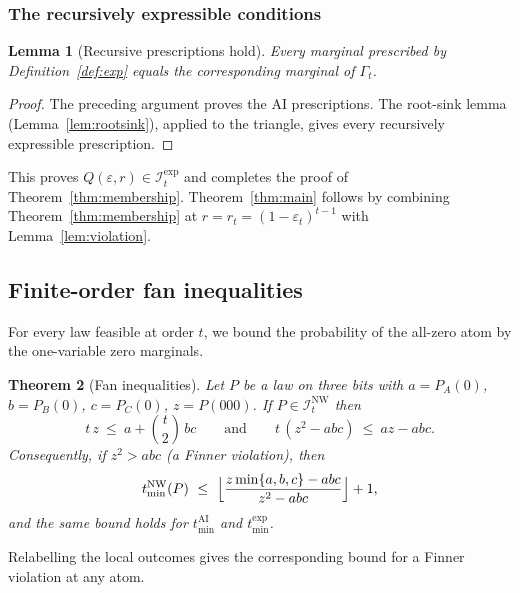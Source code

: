\documentclass[11pt]{article}
\theoremstyle{plain}
\newtheorem{theorem}{Theorem}[section]
\newtheorem{lemma}[theorem]{Lemma}
\theoremstyle{definition}
\newcommand{\INW}{\mathcal I^{\mathrm{NW}}}
\newcommand{\Iexp}{\mathcal I^{\mathrm{exp}}}
\newcommand{\eps}{\varepsilon}
\newcommand{\tmin}{t_{\min}}
\begin{document}
\subsubsection{The recursively expressible conditions}
\begin{lemma}[Recursive prescriptions hold]\label{lem:expressible}
Every marginal prescribed by Definition~\ref{def:exp} equals the corresponding marginal of $\Gamma_t$.
\end{lemma}
\begin{proof}
The preceding argument proves the AI prescriptions. The root-sink lemma (Lemma~\ref{lem:rootsink}), applied to the triangle, gives every recursively expressible prescription.
\end{proof}

This proves $Q(\eps,r)\in\Iexp_t$ and completes the proof of Theorem~\ref{thm:membership}. Theorem~\ref{thm:main} follows by combining Theorem~\ref{thm:membership} at $r=r_t=(1-\eps_t)^{t-1}$ with Lemma~\ref{lem:violation}.


\subsection{Finite-order fan inequalities}\label{sec:fan}

For every law feasible at order $t$, we bound the probability of the all-zero atom by the one-variable zero marginals.

\begin{theorem}[Fan inequalities]\label{thm:fan}
Let $P$ be a law on three bits with $a=P_A(0)$, $b=P_B(0)$, $c=P_C(0)$, $z=P(000)$. If $P\in\INW_t$ then
\begin{equation}\label{eq:fan}
t\,z\ \le\ a+\binom t2\,bc
\qquad\text{and}\qquad
t\,(z^2-abc)\ \le\ az-abc .
\end{equation}
Consequently, if $z^2>abc$ (a Finner violation), then
\begin{equation}\label{eq:fan-order}
\tmin^{\mathrm{NW}}(P)\ \le\ \Bigl\lfloor\frac{z\min\{a,b,c\}-abc}{z^2-abc}\Bigr\rfloor+1 ,
\end{equation}
and the same bound holds for $\tmin^{\mathrm{AI}}$ and $\tmin^{\mathrm{exp}}$.
\end{theorem}

Relabelling the local outcomes gives the corresponding bound for a Finner violation at any atom.
\end{document}
